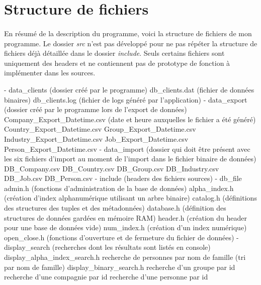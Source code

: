 \documentclass{article}
\begin{document}
    \newpage
    \section{Structure de fichiers}
    \paragraph{}
    En résumé de la description du programme, voici la structure de fichiers de mon programme. Le dossier \emph{src} n'est pas développé pour ne pas répéter la structure de fichiers déjà détaillée dans le dossier \emph{include}. Seuls certains fichiers sont uniquement des headers et ne contiennent pas de prototype de fonction à implémenter dans les sources.
 
    \begin{verbatimtab}
    - data_clients (dossier créé par le programme)
        db_clients.dat (fichier de données binaires)
        db_clients.log (fichier de logs généré par l'application)
    - data_export (dossier créé par le programme lors de l'export de données)
        Company_Export_Datetime.csv (date et heure auxquelles le fichier a été généré)
        Country_Export_Datetime.csv
        Group_Export_Datetime.csv
        Industry_Export_Datetime.csv
        Job_Export_Datetime.csv
        Person_Export_Datetime.csv
    - data_import (dossier qui doit être présent avec les six fichiers d'import
                    au moment de l'import dans le fichier binaire de données)
        DB_Company.csv
        DB_Country.csv
        DB_Group.csv
        DB_Industry.csv
        DB_Job.csv
        DB_Person.csv
    - include (headers des fichiers sources)
        - db_file
            admin.h (fonctions d'administration de la base de données)
            alpha_index.h (création d'index alphanumérique utilisant un arbre binaire)
            catalog.h (définitions des structures des tuples et des métadonnées)
            database.h (définition des structures de données gardées en mémoire RAM)
            header.h (création du header pour une base de données vide)
            num_index.h (création d'un index numérique)
            open_close.h (fonctions d'ouverture et de fermeture du fichier de données)
        - display_search (recherches dont les résultats sont listés en console)
            display_alpha_index_search.h
                recherche de personnes par nom de famille (tri par nom de famille)
            display_binary_search.h
                recherche d'un groupe par id
                recherche d'une compagnie par id
                recherche d'une personne par id

\end{verbatimtab}
\end{document}

